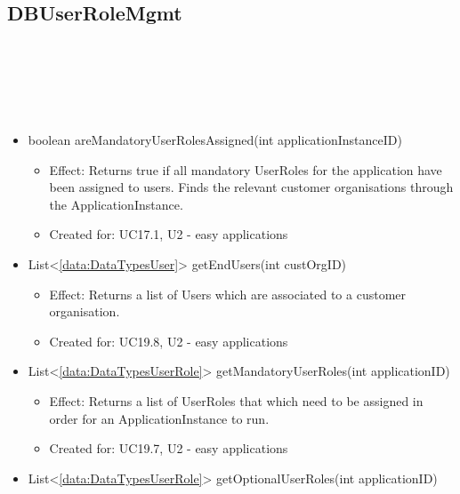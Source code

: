   \subsection{DBUserRoleMgmt}\label{int:OtherDataDatabaseOtherDataDBDBUserRoleMgmt}
    \begin{description}
      \item[Provided by:] \iconcomponent{}~
      \item[Required by:] \iconcomponent{}~
      \item[Operations:] ~
    \begin{itemize}[noitemsep,nolistsep,leftmargin=-.25cm]
      \item \textsf{boolean areMandatoryUserRolesAssigned(int applicationInstanceID)}
        \begin{itemize}[noitemsep,nolistsep]
           \item Effect: Returns true if all mandatory UserRoles for the application have been assigned to users. Finds the relevant customer organisations through the ApplicationInstance.
\item Created for: UC17.1, U2 - easy applications
        \end{itemize}
      \item \textsf{List\textless{}\ref{data:DataTypesUser}\textgreater{} getEndUsers(int custOrgID)}
        \begin{itemize}[noitemsep,nolistsep]
           \item Effect: Returns a list of Users which are associated to a customer organisation.
\item Created for: UC19.8, U2 - easy applications
        \end{itemize}
      \item \textsf{List\textless{}\ref{data:DataTypesUserRole}\textgreater{} getMandatoryUserRoles(int applicationID)}
        \begin{itemize}[noitemsep,nolistsep]
           \item Effect: Returns a list of UserRoles that which need to be assigned in order for an ApplicationInstance to run.
\item Created for: UC19.7, U2 - easy applications
        \end{itemize}
      \item \textsf{List\textless{}\ref{data:DataTypesUserRole}\textgreater{} getOptionalUserRoles(int applicationID)}

\end{itemize}
\end{description}
